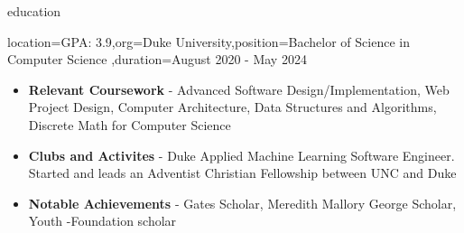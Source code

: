 \documentclass{resume}
\begin{document}
\makeheader

\newcommand{\skill}[2]{\textbf{#1} - #2}

\begin{ResumeSection}{education}
    \begin{ResumeSubsection}{location={GPA: 3.9},org={Duke University},position={Bachelor of Science in Computer Science}
        ,duration={August 2020 - May 2024}}
        \begin{itemize}
            \item \skill{Relevant Coursework}{Advanced Software Design/Implementation, Web Project Design, Computer Architecture,
                Data Structures and Algorithms, Discrete Math for Computer Science}
            \item \skill{Clubs and Activites}{Duke Applied Machine Learning
                Software Engineer. Started and leads an Adventist Christian Fellowship between UNC and Duke}
            \item \skill{Notable Achievements}{Gates Scholar, Meredith Mallory
                George Scholar, Youth -Foundation scholar}
        \end{itemize}
    \end{ResumeSubsection}
\end{ResumeSection}
\end{document}
